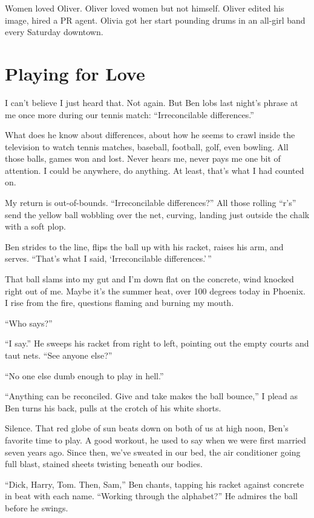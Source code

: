 \documentclass[twoside,10pt]{book}
\begin{document}
Women loved Oliver. Oliver loved women but not himself. Oliver edited
his image, hired a PR agent. Olivia got her start pounding drums in an
all-girl band every Saturday downtown.



\cleardoublepage
\chapter{Playing for Love}

I can't believe I just heard that. Not again. But Ben lobs last night's
phrase at me once more during our tennis match: ``Irreconcilable
differences.''

What does he know about differences, about how he seems to crawl inside
the television to watch tennis matches, baseball, football, golf, even
bowling. All those balls, games won and lost. Never hears me, never pays
me one bit of attention. I could be anywhere, do anything. At least,
that's what I had counted on.

My return is out-of-bounds. ``Irreconcilable differences?'' All those
rolling ``r's'' send the yellow ball wobbling over the net, curving,
landing just outside the chalk with a soft plop.

Ben strides to the line, flips the ball up with his racket, raises his
arm, and serves. ``That's what I said, `Irreconcilable differences.'\,''

That ball slams into my gut and I'm down flat on the concrete, wind
knocked right out of me. Maybe it's the summer heat, over 100 degrees
today in Phoenix. I rise from the fire, questions flaming and burning my
mouth.

``Who says?''

``I say.'' He sweeps his racket from right to left, pointing out the
empty courts and taut nets. ``See anyone else?''

``No one else dumb enough to play in hell.''

``Anything can be reconciled. Give and take makes the ball bounce,'' I
plead as Ben turns his back, pulls at the crotch of his white shorts.

Silence. That red globe of sun beats down on both of us at high noon,
Ben's favorite time to play. A good workout, he used to say when we were
first married seven years ago. Since then, we've sweated in our bed, the
air conditioner going full blast, stained sheets twisting beneath our
bodies.

``Dick, Harry, Tom. Then, Sam,'' Ben chants, tapping his racket against
concrete in beat with each name. ``Working through the alphabet?'' He
admires the ball before he swings.
\end{document}
